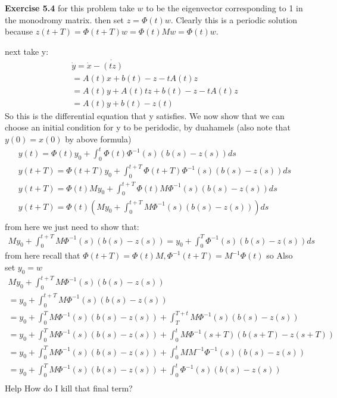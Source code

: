 \documentclass[12pt]{article}
\newenvironment{exercise}[1]{\vspace{.1in}\noindent\textbf{Exercise #1 \hspace{.05em}}}{}
\theoremstyle{definition}
\theoremstyle{remark}
\begin{document}
\begin{exercise}{5.4}
	for this problem take $w$ to be the eigenvector corresponding to 1 in the monodromy matrix. then set $z=\Phi(t)w$. Clearly this is a periodic solution because $z(t+T)=\Phi(t+T)w=\Phi(t)Mw=\Phi(t)w$.

	next take y:
	\begin{align}
		\dot y = \dot x-\dot{(tz)}  \\
		=A(t)x+b(t)-z-tA(t)z        \\
		=A(t)y+A(t)tz+b(t)-z-tA(t)z \\
		=A(t)y+b(t)-z(t)
	\end{align}
	So this is the differential equation that y satisfies. We now show that we can choose an initial condition for y to be peridodic, by duahamels (also note that $y(0)=x(0)$ by above formula)
	\begin{align}
		y(t)=\Phi(t)y_0+\int_0^t\Phi(t)\Phi^{-1}(s)(b(s)-z(s))ds           \\
		y(t+T)=\Phi(t+T)y_0+\int_0^{t+T}\Phi(t+T)\Phi^{-1}(s)(b(s)-z(s))ds \\
		y(t+T)=\Phi(t)My_0+\int_0^{t+T}\Phi(t)M\Phi^{-1}(s)(b(s)-z(s))ds   \\
		y(t+T)=\Phi(t)(My_0+\int_0^{t+T}M\Phi^{-1}(s)(b(s)-z(s)))ds        \\
	\end{align}
	from here we just need to show that:
	\begin{align}
		My_0+\int_0^{t+T}M\Phi^{-1}(s)(b(s)-z(s))  =y_0+\int_0^T\Phi^{-1}(s)(b(s)-z(s))ds
	\end{align}
	from here recall that $\Phi(t+T)=\Phi(t)M,\Phi^{-1}(t+T)=M^{-1}\Phi(t)$ so Also set $y_0=w$
	\begin{align}
		My_0+\int_0^{t+T}M\Phi^{-1}(s)(b(s)-z(s))                                        \\
		=y_0+\int_0^{t+T}M\Phi^{-1}(s)(b(s)-z(s))                                        \\
		=y_0+\int_0^{T}M\Phi^{-1}(s)(b(s)-z(s))+\int_T^{T+t}M\Phi^{-1}(s)(b(s)-z(s))     \\
		=y_0+\int_0^{T}M\Phi^{-1}(s)(b(s)-z(s))+\int_0^{t}M\Phi^{-1}(s+T)(b(s+T)-z(s+T)) \\
		=y_0+\int_0^{T}M\Phi^{-1}(s)(b(s)-z(s))+\int_0^{t}MM^{-1}\Phi^{-1}(s)(b(s)-z(s)) \\
		=y_0+\int_0^{T}M\Phi^{-1}(s)(b(s)-z(s))+\int_0^{t}\Phi^{-1}(s)(b(s)-z(s))        \\
	\end{align}
	Help How do I kill that final term?
\end{exercise}
\end{document}
